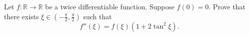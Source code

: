 \documentclass{article}
\begin{document}
\setlength{\parindent}{0pt}
Let \( f : \mathbb{R} \to \mathbb{R} \) be a twice differentiable function. Suppose \( f(0) = 0 \). Prove that there exists \( \xi \in \left(-\frac{\pi}{2}, \frac{\pi}{2}\right) \) such that
\[
f''(\xi) = f(\xi)(1 + 2 \tan^2 \xi).
\]
\end{document}
